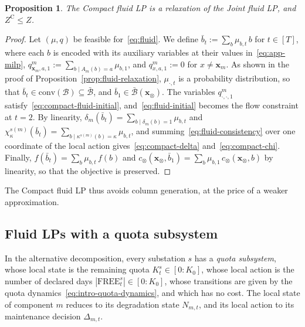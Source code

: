 \documentclass{article}
\newtheorem{proposition}{Proposition}
\begin{document}
\begin{proposition}\label{prop:compactLP}
The Compact fluid LP is a relaxation of the Joint fluid LP, and $Z^{\mathrm{C}}\le Z$.
\end{proposition}
\begin{proof}
Let $(\mu, q)$ be feasible for~\eqref{eq:fluid}. We define $\bar b_t := \sum_b \mu_{b,t}\, b$ for $t \in [T]$, where each
$b$ is encoded with its auxiliary variables at their values in~\eqref{eq:app-milp}, $q^m_{\mathbf{x}_m,a,1} :=
\sum_{b \mid A_m(b) = a} \mu_{b,1}$, and $q^m_{x,a,1} := 0$ for $x \neq \mathbf{x}_m$. As shown in the proof of Proposition~\ref{prop:fluid-relaxation}, $\mu_{\cdot,t}$ is
a probability distribution, so that $\bar b_t \in \mathrm{conv}(\mathcal{B}) \subseteq \bar{\mathcal{B}}$, and $\bar b_1
\in \bar{\mathcal{B}}(\mathbf{x}_\otimes)$. The variables $q^m_{\cdot,\cdot,1}$ satisfy~\eqref{eq:compact-fluid-initial},
and~\eqref{eq:fluid-initial} becomes the flow constraint at $t = 2$. By linearity, $\delta_m(\bar b_t) = \sum_{b \mid
\delta_m(b) = 1} \mu_{b,t}$ and $\chi^{s(m)}_\kappa(\bar b_t) = \sum_{b \mid \kappa^{s(m)}(b) = \kappa} \mu_{b,t}$, and
summing~\eqref{eq:fluid-consistency} over one coordinate of the local action gives~\eqref{eq:compact-delta}
and~\eqref{eq:compact-chi}. Finally, $f(\bar b_t) = \sum_b \mu_{b,t}\, f(b)$ and $c_\otimes(\mathbf{x}_\otimes, \bar
b_1) = \sum_b \mu_{b,1}\, c_\otimes(\mathbf{x}_\otimes, b)$ by linearity, so that the objective is preserved.
\end{proof}
The Compact fluid LP thus avoids column generation, at the price of a weaker approximation.

\subsection{Fluid LPs with a quota subsystem}
\label{sec:quota-subsystem}

In the alternative decomposition, every substation $s$ has a \emph{quota subsystem}, whose local state is the remaining
quota $K^s_t \in [0:K_0]$, whose local action is the number of declared days $|\text{FREE}^s_t| \in [0:K_0]$, whose
transitions are given by the quota dynamics~\eqref{eq:intro-quota-dynamics}, and which has no cost. The local state of
component $m$ reduces to its degradation state $N_{m,t}$, and its local action to its maintenance decision
$\Delta_{m,t}$.
\end{document}
